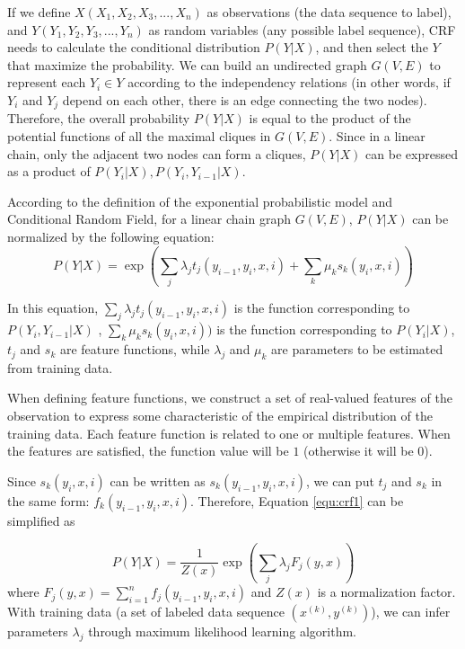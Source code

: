 If we define $X(X_{1},X_{2},X_{3},...,X_{n})$ as observations (the data sequence to label), and $Y(Y_{1},Y_{2},Y_{3},...,Y_{n})$ as random variables (any possible label sequence), CRF needs to calculate the conditional distribution $P(Y|X)$, and then select the $Y$ that maximize the probability. We can build an undirected graph $G(V,E)$ to represent each $Y_{i} \in Y$ according to the independency relations (in other words, if $Y_{i}$ and $Y_{j}$ depend on each other, there is an edge connecting the two nodes).
Therefore, the overall probability $P(Y|X)$ is equal to the product of the potential functions of all the maximal cliques in $G(V,E)$.
Since in a linear chain, only the adjacent two nodes can form a cliques, $P(Y|X)$ can be expressed as a product of $P(Y_{i}|X),P(Y_{i},Y_{i-1}|X)$.

According to the definition of the exponential probabilistic model and Conditional Random Field, for a linear chain graph $G(V,E)$,
$P(Y|X)$ can be normalized by the following equation:
\begin{equation}\label{equ:crf1}
    P(Y|X)=\exp(\sum_{j}\lambda_{j}t_{j}(y_{i-1},y_{i},x,i)+\sum_{k}\mu_{k}s_{k}(y_{i},x,i))
\end{equation}

In this equation, $\sum_{j}\lambda_{j}t_{j}(y_{i-1},y_{i},x,i)$ is the function corresponding to $P(Y_{i},Y_{i-1}|X)$ ,
 $\sum_{k}\mu_{k}s_{k}(y_{i},x,i))$ is the function corresponding to $P(Y_{i}|X)$, $t_{j}$ and $s_{k}$ are feature functions, while
$\lambda_{j}$ and $\mu_{k}$ are parameters to be estimated from training data.

When defining feature functions, we construct a set of real-valued features of the observation to express some characteristic of the empirical distribution of the training data. Each feature function is related to one or multiple features. When the features are satisfied, the function value will be $1$ (otherwise it will be $0$).

Since $s_{k}(y_{i},x,i)$ can be written as $s_{k}(y_{i-1},y_{i},x,i)$, we can put $t_{j}$ and $s_{k}$ in the same form: $f_{k}(y_{i-1},y_{i},x,i)$.
Therefore, Equation \ref{equ:crf1} can be simplified as

\begin{equation}\label{equ:crf2}
    P(Y|X)=\frac{1}{Z(x)}\exp(\sum_{j}\lambda_{j}F_{j}(y,x))
\end{equation}
where $F_{j}(y,x)=\sum_{i=1}^{n}f_{j}(y_{i-1},y_{i},x,i)$ and $Z(x)$ is a normalization factor.
With training data (a set of labeled data sequence ${(x^{(k)},y^{(k)})}$),
we can infer parameters $\lambda_{j}$ through
maximum likelihood learning algorithm.

